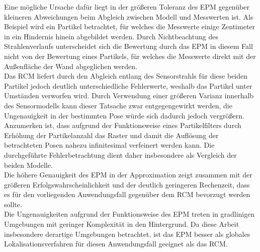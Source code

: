 Eine mögliche Ursache dafür liegt in der größeren Toleranz des EPM gegenüber kleineren Abweichungen beim Abgleich zwischen Modell und Messwerten ist. Als Beispiel wird ein Partikel betrachtet, für welches die Messwerte einige Zentimeter in ein Hindernis hinein abgebildet werden. Durch Nichtbeachtung des Strahlenverlaufs unterscheidet sich die Bewertung durch das EPM in diesem Fall nicht von der Bewertung eines Partikels, für welches die Messwerte direkt mit der Außenfläche der Wand abgeglichen werden.\\
Das RCM liefert durch den Abgleich entlang des Sensorstrahls für diese beiden Partikel jedoch deutlich unterschiedliche Fehlerwerte, weshalb das Partikel unter Umständen verworfen wird. Durch Verwendung einer größeren Varianz innerhalb des Sensormodells kann dieser Tatsache zwar entgegengewirkt werden, die Ungenauigkeit in der bestimmten Pose würde sich dadurch jedoch vergrößern.\\

Anzumerken ist, dass aufgrund der Funktionsweise eines Partikelfilters durch Erhöhung der Partikelanzahl das Raster und damit die Auflösung der betrachteten Posen nahezu infinitesimal verfeinert werden kann. Die durchgeführte Fehlerbetrachtung dient daher insbesondere als Vergleich der beiden Modelle.\\
Die höhere Genauigkeit des EPM in der Approximation zeigt zusammen mit der größeren Erfolgswahrscheinlichkeit und der deutlich geringeren Rechenzeit, dass es für den vorliegenden Anwendungsfall gegenüber dem RCM bevorzugt werden sollte.\\
Die Ungenauigkeiten aufgrund der Funktionsweise des EPM treten in gradlinigen Umgebungen mit geringer Komplexität in den Hintergrund. Da diese Arbeit insbesondere derartige Umgebungen betrachtet, ist das EPM besser als globales Lokalisationsverfahren für diesen Anwendungsfall geeignet als das RCM.

\prever{
}






